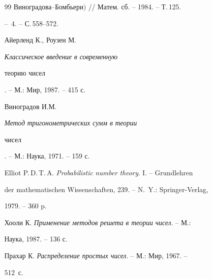 \begin{thebibliography}{99}
{Виноградова--Бомбьери$)$} // Матем. сб. -- 1984. -- Т.\,125.


-- \No\,4. -- С.\,558--572.




Айерленд К., Роузен М. {\em Классическое введение в современную


теорию чисел}. -- М.: Мир, 1987. -- 415 с.




Виноградов И.М. {\em Метод тригонометрических сумм в теории


чисел}. -- М.: Наука, 1971. -- 159 с.




Elliot P.\,D.\,T.\,A. {\em Probabilistic number theory}. I. -- Grundlehren


der mathematischen Wissenschaften, 239. -- N.~Y.: Springer-Verlag,


1979. -- 360 p.




Хооли К. {\em Применение методов решета в теории чисел}. -- М.:


Наука, 1987. -- 136 с.




Прахар К. {\em Распределение простых чисел}. -- М.: Мир, 1967. --


512~с.





\end{thebibliography}





\vskip 2cm












\label{end}





